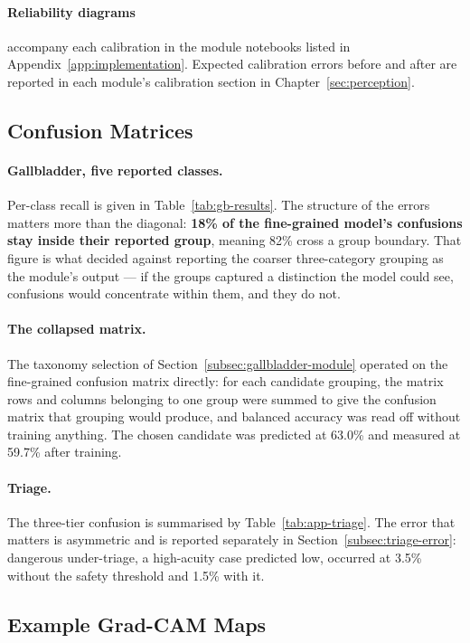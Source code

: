 \paragraph{Reliability diagrams} accompany each calibration in the module notebooks listed in
Appendix~\ref{app:implementation}. Expected calibration errors before and after are reported
in each module's calibration section in Chapter~\ref{sec:perception}.

\subsection{Confusion Matrices}
\label{app:confusion}

\paragraph{Gallbladder, five reported classes.} Per-class recall is given in
Table~\ref{tab:gb-results}. The structure of the errors matters more than the diagonal:
\textbf{18\% of the fine-grained model's confusions stay inside their reported group}, meaning
82\% cross a group boundary. That figure is what decided against reporting the coarser
three-category grouping as the module's output --- if the groups captured a distinction the
model could see, confusions would concentrate within them, and they do not.

\paragraph{The collapsed matrix.} The taxonomy selection of
Section~\ref{subsec:gallbladder-module} operated on the fine-grained confusion matrix directly:
for each candidate grouping, the matrix rows and columns belonging to one group were summed to
give the confusion matrix that grouping would produce, and balanced accuracy was read off
without training anything. The chosen candidate was predicted at 63.0\% and measured at 59.7\%
after training.

\paragraph{Triage.} The three-tier confusion is summarised by
Table~\ref{tab:app-triage}. The error that matters is asymmetric and is reported separately in
Section~\ref{subsec:triage-error}: dangerous under-triage, a high-acuity case predicted low,
occurred at 3.5\% without the safety threshold and 1.5\% with it.

\subsection{Example Grad-CAM Maps}
\label{app:gradcam}

